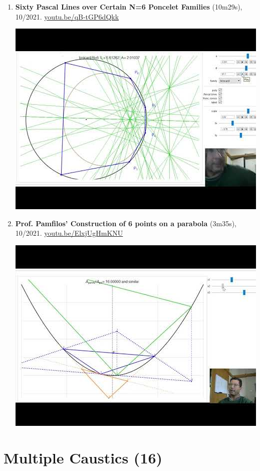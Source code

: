 \documentclass[12pt]{article}
\begin{document}
\begin{enumerate}[resume]
% 
\item \textbf{Sixty Pascal Lines over Certain N=6 Poncelet Families} (10m29s), 10/2021. \href{https://youtu.be/qB-tGP6dQkk}{\url{youtu.be/qB-tGP6dQkk}}
\begin{center}\includegraphics[width=.5\textwidth]{pics/qB-tGP6dQkk.jpg}\end{center}
% 
\item \textbf{Prof. Pamfilos' Construction of 6 points on a parabola} (3m35s), 10/2021. \href{https://youtu.be/ElxjUgHmKNU}{\url{youtu.be/ElxjUgHmKNU}}
\begin{center}\includegraphics[width=.5\textwidth]{pics/ElxjUgHmKNU.jpg}\end{center}
% 
\end{enumerate}

\section{Multiple Caustics (16)}
\end{document}
